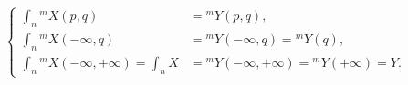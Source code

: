 \begin{equation}
\left\{
\begin{aligned}
\int_n{}^{m}\!X(p,q)
  &={}^{m}\!Y(p,q),\\
\int_n{}^{m}\!X(-\infty,q)
  &={}^{m}\!Y(-\infty,q)={}^{m}\!Y(q),\\
\int_n{}^{m}\!X(-\infty,+\infty)=\int_n X
  &={}^{m}\!Y(-\infty,+\infty)={}^{m}\!Y(+\infty)=Y.
\end{aligned}
\right.
\tag{4.1.6.5}
\end{equation}
\endgroup
